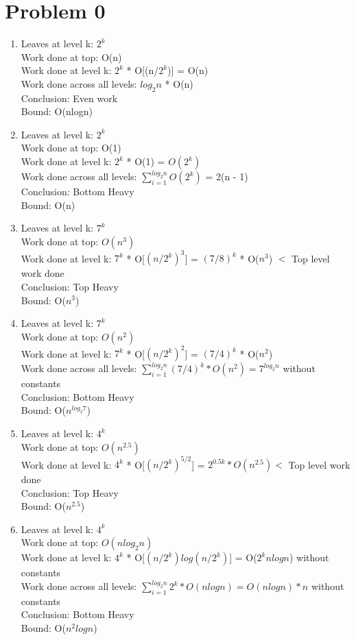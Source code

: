 \documentclass[12pt,letterpaper]{article}
\begin{document}
\section*{Problem 0}

\begin{enumerate}
    \item
    Leaves at level k: $2^k$ \\
    Work done at top: O(n) \\
    Work done at level k: $2^k$ * O[(n/$2^k$)] = O(n)\\
    Work done across all levels: $log_2 n$ * O(n) \\
    Conclusion: Even work \\
    Bound: O(nlogn)
    \item
    Leaves at level k: $2^k$ \\
    Work done at top: O(1) \\
    Work done at level k: $2^k$ * O(1) = $O(2^k)$ \\
    Work done across all levels: $\sum^{log_2 n}_{i=1} O(2^k)$ = 2(n - 1) \\
    Conclusion: Bottom Heavy \\
    Bound: O(n)
     \item
    Leaves at level k: $7^k$ \\
    Work done at top: $O(n^3)$ \\
    Work done at level k: $7^k$ * O[$(n/{2^k})^3$] = $(7/8)^k$ * O($n^3$) $<$ Top level work done \\
    Conclusion: Top Heavy \\
    Bound: O($n^3$)
    \item
    Leaves at level k: $7^k$ \\
    Work done at top: $O(n^2)$ \\
    Work done at level k: $7^k$ * O[$(n/{2^k})^2$] = $(7/4)^k$ * O($n^2$) \\
    Work done across all levels: $\sum^{log_2n}_{i=1} (7/4)^k * O(n^2) = 7^{log_2 n}$ without constants \\
    Conclusion: Bottom Heavy \\
    Bound: O($n^{log_2 7}$)
    \item
    Leaves at level k: $4^k$ \\
    Work done at top: $O(n^{2.5})$ \\
    Work done at level k: $4^k$ * O[$(n/{2^k})^{5/2}$] = $2^{0.5k} * O(n^{2.5}) <$ Top level work done \\
    Conclusion: Top Heavy \\
    Bound: O($n^{2.5}$)
    \item
    Leaves at level k: $4^k$ \\
    Work done at top: $O(nlog_2 n)$ \\
    Work done at level k: $4^k$ * O[$(n/2^k)log(n/2^k)$] = O($2^knlogn$) without constants \\
    Work done across all levels: $\sum^{log_2n}_{i=1} 2^k * O(nlogn) = O(nlogn) * n $ without constants \\
    Conclusion: Bottom Heavy \\
    Bound: O($n^2logn$)
\end{enumerate}
\end{document}
